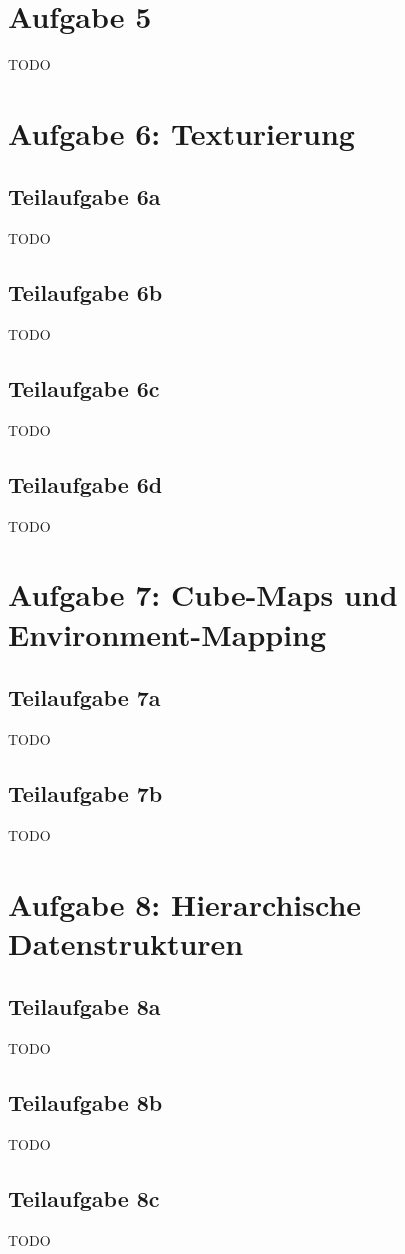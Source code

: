 \documentclass[a4paper]{scrartcl}
\begin{document}
\section*{Aufgabe 5}
TODO

\section*{Aufgabe 6: Texturierung}
\subsection*{Teilaufgabe 6a}
TODO
\subsection*{Teilaufgabe 6b}
TODO
\subsection*{Teilaufgabe 6c}
TODO
\subsection*{Teilaufgabe 6d}
TODO

\section*{Aufgabe 7: Cube-Maps und Environment-Mapping}
\subsection*{Teilaufgabe 7a}
TODO
\subsection*{Teilaufgabe 7b}
TODO

\section*{Aufgabe 8: Hierarchische Datenstrukturen}
\subsection*{Teilaufgabe 8a}
TODO
\subsection*{Teilaufgabe 8b}
TODO
\subsection*{Teilaufgabe 8c}
TODO
\end{document}
